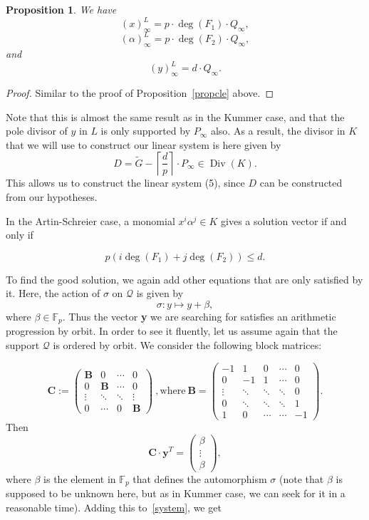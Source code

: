 \documentclass[10pt]{article}
\newtheorem{prop1}[thm]{Proposition}
\theoremstyle{definition}
\theoremstyle{definition}
\theoremstyle{definition}
\newcommand{\cd}{\cdot}
\newcommand{\QR}{\mathcal{Q}}
\newcommand{\Div}{\operatorname{Div}}
\begin{document}
\begin{prop1} \label{propcle2}
We have
\[(x)^L_{\infty} = p \cd \deg(F_1) \cd Q_{\infty},\]
\[(\alpha)^L_{\infty} = p \cd \deg(F_2) \cd Q_{\infty},\]
and
\[(y)^L_{\infty} = d \cd Q_{\infty}.\]
\end{prop1}

\begin{proof}
Similar to the proof of Proposition~\ref{propcle} above.
\end{proof}

Note that this is almost the same result as in the Kummer case, and that the pole divisor of $y$ in $L$ is only supported by $P_{\infty}$ also. As a result, the divisor in $K$ that we will use to construct our linear system is here given by 
\[D = \tilde{G} - \left\lceil\frac{d}{p}\right\rceil \cd P_{\infty} \in \Div(K).\]
This allows us to construct the linear system (5), since $D$ can be constructed from our hypotheses. 

In the Artin-Schreier case, a monomial $x^i\alpha^j \in K$ gives a solution vector if and only if 

\[p  (i \deg(F_1)+j \deg(F_2)) \leq d.\]

To find the good solution, we again add other equations that are only satisfied by it. Here, the action of $\sigma$ on $\QR$ is given by 
\[\sigma : y \longmapsto y + \beta,\]
where $\beta \in \mathbb{F}_p$. Thus the vector \textbf{y} we are searching for satisfies an arithmetic progression by orbit. In order to see it fluently, let us assume again that the support $\QR$ is ordered by orbit. We consider the following block matrices:

\begin{equation*} 
\mathbf{C} := 
\begin{pmatrix}
\mathbf{B} & 0 & \cdots & 0 \\
0 & \mathbf{B} & \cdots & 0 \\
\vdots & \ddots & \ddots & \vdots \\
0 & \cdots & 0 & \mathbf{B}
\end{pmatrix} \ , \mathrm{where} \ 
\mathbf{B} = 
\begin{pmatrix}
-1 & 1 & 0 & \cdots & 0 \\
0 & -1 & 1 & \cdots & 0 \\
\vdots & \ddots & \ddots & \ddots & 0 \\
0 & \ddots & \ddots & \ddots & 1 \\
1 & 0 & \cdots & \cdots & -1
\end{pmatrix}.
\end{equation*}
Then 
\begin{equation*}
\mathbf{C} \cd \textbf{y}^T
= 
\begin{pmatrix}
\beta \\
\vdots \\
\beta
\end{pmatrix},
\end{equation*}
where $\beta$ is the element in $\mathbb{F}_p$ that defines the automorphism $\sigma$ (note that $\beta$ is supposed to be unknown here, but as in Kummer case, we can seek for it in a reasonable time). Adding this to~\eqref{system}, we get
\end{document}
